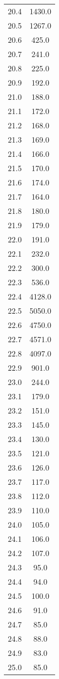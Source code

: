 \begin{table}
\begin{minipage}{0.5\textwidth}
\begin{tabular}{c c}
20.4	&	1430.0\\
20.5	&	1267.0\\
20.6	&	425.0\\
20.7	&	241.0\\
20.8	&	225.0\\
20.9	&	192.0\\
21.0	&	188.0\\
21.1	&	172.0\\
21.2	&	168.0\\
21.3	&	169.0\\
21.4	&	166.0\\
21.5	&	170.0\\
21.6	&	174.0\\
21.7	&	164.0\\
21.8	&	180.0\\
21.9	&	179.0\\
22.0	&	191.0\\
22.1	&	232.0\\
22.2	&	300.0\\
22.3	&	536.0\\
22.4	&	4128.0\\
22.5	&	5050.0\\
22.6	&	4750.0\\
22.7	&	4571.0\\
22.8	&	4097.0\\
22.9	&	901.0\\
23.0	&	244.0\\
23.1	&	179.0\\
23.2	&	151.0\\
23.3	&	145.0\\
23.4	&	130.0\\
23.5	&	121.0\\
23.6	&	126.0\\
23.7	&	117.0\\
23.8	&	112.0\\
23.9	&	110.0\\
24.0	&	105.0\\
24.1	&	106.0\\
24.2	&	107.0\\
24.3	&	95.0\\
24.4	&	94.0\\
24.5	&	100.0\\
24.6	&	91.0\\
24.7	&	85.0\\
24.8	&	88.0\\
24.9	&	83.0\\
25.0	&	85.0\\
    \bottomrule
\end{tabular}
\end{minipage}
\end{table}

